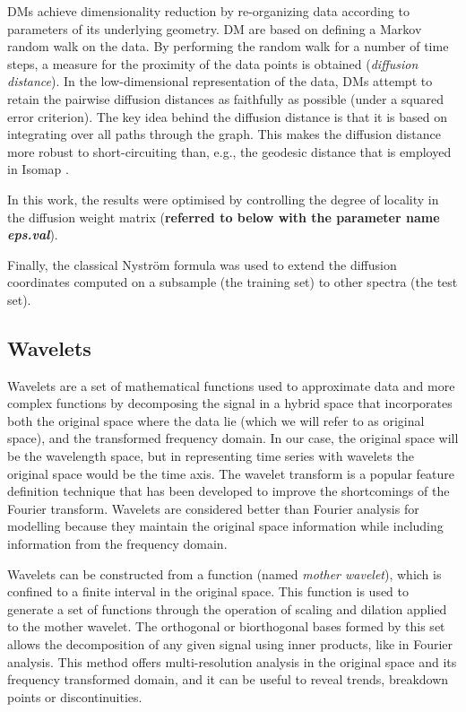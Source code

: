 \documentclass[a4paper,fleqn,usenatbib]{mnras}
\begin{document}
{DMs achieve dimensionality reduction by re-organizing data according
to parameters of its underlying geometry. DM are based on defining a
Markov random walk on the data. By performing the random walk for a
number of time steps, a measure for the proximity of the data points
is obtained (\textit{diffusion distance}). In the low-dimensional
representation of the data, DMs attempt to retain the pairwise
diffusion distances as faithfully as possible (under a squared error
criterion). The key idea behind the diffusion distance is that it is
based on integrating over all paths through the graph. This makes the
diffusion distance more robust to short-circuiting than, e.g., the
geodesic distance that is employed in Isomap \citep{tenenbaum:00}.

In this work, the results were optimised by controlling the degree of
locality in the diffusion weight matrix ({\bf referred to below with 
the parameter name \textit{eps.val}}).

Finally, the classical Nystr\"{o}m formula \citep{NIPS2000_1866} was used
to extend the diffusion coordinates computed on a subsample (the training 
set) to other spectra (the test set).


\subsection{Wavelets}

Wavelets \citep{mallat:98} are a set of mathematical functions used to
approximate data and more complex functions by decomposing the signal
in a hybrid space that incorporates both the original space where the
data lie (which we will refer to as original space), and the
transformed frequency domain. In our case, the original space will be
the wavelength space, but in representing time series with wavelets
the original space would be the time axis. The wavelet transform is a
popular feature definition technique that has been developed to
improve the shortcomings of the Fourier transform. Wavelets are
considered better than Fourier analysis for modelling because they
maintain the original space information while including information
from the frequency domain.

Wavelets can be constructed from a function (named \textit{mother
  wavelet}), which is confined to a finite interval in the original
space. This function is used to generate a set of functions through
the operation of scaling and dilation applied to the mother
wavelet. The orthogonal or biorthogonal bases formed by this set
allows the decomposition of any given signal using inner products,
like in Fourier analysis. This method offers multi-resolution analysis
in the original space and its frequency transformed domain, and it can
be useful to reveal trends, breakdown points or discontinuities.

}
\end{document}
